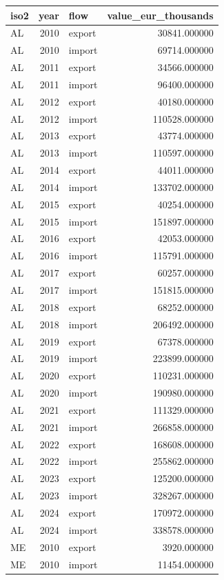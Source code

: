 \begin{tabular}{lrlr}
\toprule
iso2 & year & flow & value_eur_thousands \\
\midrule
AL & 2010 & export & 30841.000000 \\
AL & 2010 & import & 69714.000000 \\
AL & 2011 & export & 34566.000000 \\
AL & 2011 & import & 96400.000000 \\
AL & 2012 & export & 40180.000000 \\
AL & 2012 & import & 110528.000000 \\
AL & 2013 & export & 43774.000000 \\
AL & 2013 & import & 110597.000000 \\
AL & 2014 & export & 44011.000000 \\
AL & 2014 & import & 133702.000000 \\
AL & 2015 & export & 40254.000000 \\
AL & 2015 & import & 151897.000000 \\
AL & 2016 & export & 42053.000000 \\
AL & 2016 & import & 115791.000000 \\
AL & 2017 & export & 60257.000000 \\
AL & 2017 & import & 151815.000000 \\
AL & 2018 & export & 68252.000000 \\
AL & 2018 & import & 206492.000000 \\
AL & 2019 & export & 67378.000000 \\
AL & 2019 & import & 223899.000000 \\
AL & 2020 & export & 110231.000000 \\
AL & 2020 & import & 190980.000000 \\
AL & 2021 & export & 111329.000000 \\
AL & 2021 & import & 266858.000000 \\
AL & 2022 & export & 168608.000000 \\
AL & 2022 & import & 255862.000000 \\
AL & 2023 & export & 125200.000000 \\
AL & 2023 & import & 328267.000000 \\
AL & 2024 & export & 170972.000000 \\
AL & 2024 & import & 338578.000000 \\
ME & 2010 & export & 3920.000000 \\
ME & 2010 & import & 11454.000000 \\

\end{tabular}

